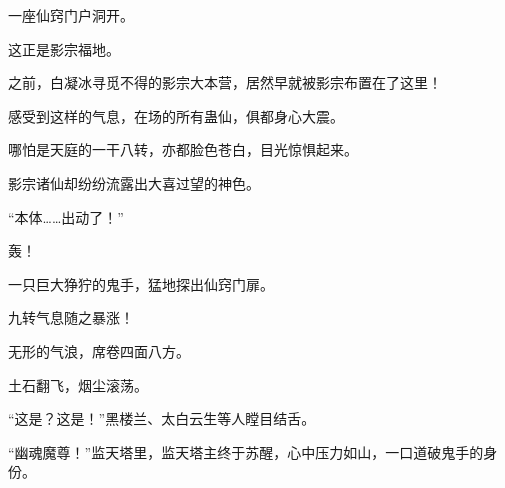 \begin{this_body}
一座仙窍门户洞开。

这正是影宗福地。

之前，白凝冰寻觅不得的影宗大本营，居然早就被影宗布置在了这里！

感受到这样的气息，在场的所有蛊仙，俱都身心大震。

哪怕是天庭的一干八转，亦都脸色苍白，目光惊惧起来。

影宗诸仙却纷纷流露出大喜过望的神色。

“本体……出动了！”

轰！

一只巨大狰狞的鬼手，猛地探出仙窍门扉。

九转气息随之暴涨！

无形的气浪，席卷四面八方。

土石翻飞，烟尘滚荡。

“这是？这是！”黑楼兰、太白云生等人瞠目结舌。

“幽魂魔尊！”监天塔里，监天塔主终于苏醒，心中压力如山，一口道破鬼手的身份。

\end{this_body}


